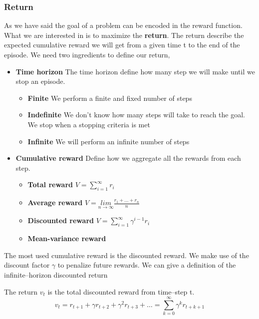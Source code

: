 \documentclass[main.tex]{subfiles}
\begin{document}
\subsubsection{Return}
As we have said the goal of a problem can be encoded in the reward function. What we are interested in is to maximize the \textbf{return}. The return describe the expected cumulative reward we will get from a given time t to the end of the episode. We need two ingredients to define our return,
\begin{itemize}
    \item \textbf{Time horizon} The time horizon define how many step we will make until we stop an episode.
    \begin{itemize}
        \item \textbf{Finite} We perform a finite and fixed number of steps
        \item \textbf{Indefinite} We don't know how many steps will take to reach the goal. We stop when a stopping criteria is met
        \item \textbf{Infinite} We will perform an infinite number of steps
    \end{itemize}
    \item \textbf{Cumulative reward} Define how we aggregate all the rewards from each step.
    \begin{itemize}
        \item \textbf{Total reward} $V = \sum_{i=1}^{\infty} r_i$
        \item \textbf{Average reward} $V = \underset{n \rightarrow \infty}{lim} \frac{r_1 + \dots + r_n}{n}$
        \item \textbf{Discounted reward} $V = \sum_{i=1}^{\infty} \gamma^{i-1} r_i$
        \item \textbf{Mean-variance reward}
    \end{itemize}
\end{itemize}
The most used cumulative reward is the discounted reward. We make use of the discount factor $\gamma$ to penalize future rewards. We can give a definition of the infinite–horizon discounted return
\begin{definition}
The return $v_t$ is the total discounted reward from time–step t.
\begin{equation}
    v_t = r_{t+1} + \gamma r_{t+2} + \gamma^2 r_{t+3} + \dots = \sum_{k=0}^{\infty} \gamma^k r_{t+k+1}
\end{equation}
\end{definition}
\end{document}
